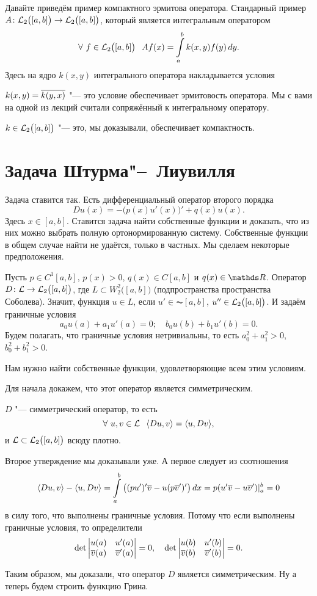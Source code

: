 Давайте приведём пример компактного эрмитова оператора. Стандарный пример $A\colon \mathcal L_2\big([a,b]\big)\rightarrow \mathcal L_2\big([a,b]\big)$, который является интегральным оператором
\[
  \forall\ f\in \mathcal L_2\big([a,b]\big)\hskip .75em plus.1em minus.08em\relax  A f(x) = \int\limits_a^b k(x,y) f(y)\,dy.
\]
Здесь на ядро $k(x,y)$ интегрального оператора накладывается условия
\begin{roItems}
\item $k(x,y) = \overline{k(y,x)}$ "--- это условие обеспечивает эрмитовость оператора. Мы с вами на одной из лекций считали сопряжённый к интегральному оператору.
\item $k\in \mathcal L_2 \big([a,b]\big)$ "--- это, мы доказывали, обеспечивает компактность.
\end{roItems}

\section{Задача Штурма"--~Лиувилля}
Задача ставится так. Есть дифференциальный оператор второго порядка
\[
  D u(x) = - \big(p(x) u'(x)\big)' + q(x) u(x).
\]
Здесь $x\in[a,b]$. Ставится задача найти собственные функции и доказать, что из них можно выбрать полную ортонормированную систему.
Собственные функции в общем случае найти не удаётся, только в частных. Мы сделаем некоторые предположения.

Пусть $p\in C^1[a,b]$, $p(x)>0$, $q(x)\in C[a,b]$ и $q(x)\in\R$. Оператор $D\colon \mathcal L\rightarrow \mathcal L_2\big([a,b]\big)$, где $L\subset W_2^2\big([a,b]\big)$ (подпространства пространства Соболева). Значит, функция $u\in L$, если $u'\in \AC[a,b]$, $u''\in\mathcal L_2\big([a,b]\big)$. И задаём граничные условия
\[
  a_0 u(a) + a_1 u'(a) = 0;\quad
  b_0 u(b) + b_1 u'(b) = 0.
\]
Будем полагать, что граничные условия нетривиальны, то есть $a_0^2 + a_1^2 >0$, $b_0^2 + b_1^2>0$.

Нам нужно найти собственные функции, удовлетворяющие всем этим условиям.

Для начала докажем, что этот оператор является симметрическим.
\begin{Lem}
  $D$ "--- симметрический оператор, то есть
\[
  \forall\ u,v\in\L\pau \la Du,v\ra = \la u, Dv\ra,
\]
и $\mathcal L\subset \mathcal L_2\big([a,b]\big)$ всюду плотно.
\end{Lem}
\begin{Proof}
Второе утверждение мы доказывали уже. А первое следует из соотношения
\[
  \langle Du,v\rangle - \langle u,Dv\rangle = \int\limits_a^b \big((pu')'\overline{v} - u(p\overline{v}')'\big)\,dx = 
  p(u'\overline{v} - u\overline{v}')|_a^b = 0
\]
в силу того, что выполнены граничные условия. Потому что если выполнены граничные условия, то определители
\[
  \det\begin{vmatrix}
  u(a) & u'(a)\\
  \overline{v}(a) & \overline{v}'(a)
\end{vmatrix} = 0,\quad
  \det\begin{vmatrix}
  u(b) & u'(b)\\
  \overline{v}(b) & \overline{v}'(b)
\end{vmatrix} = 0.
\]
\end{Proof}
Таким образом, мы доказали, что оператор $D$ является симметрическим. Ну а теперь будем строить функцию Грина.

